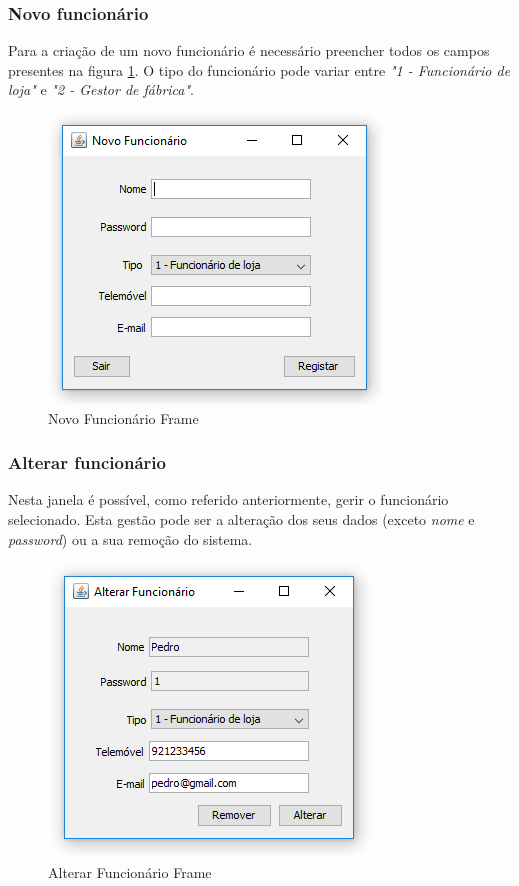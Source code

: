 \documentclass[11pt]{article} %
\begin{document}
\subsubsection{Novo funcionário}
\label{novofunc}

Para a criação de um novo funcionário é necessário preencher todos os campos presentes na figura \ref{novofuncframe}. O tipo do funcionário pode variar entre \textit{"1 - Funcionário de loja"} e \textit{"2 - Gestor de fábrica"}.

\begin{figure}[H]
	\centering
	\includegraphics[]{novofuncframe.png}
	\caption{Novo Funcionário Frame}
	\label{novofuncframe}
\end{figure}


\subsubsection{Alterar funcionário}
\label{alterafunc}

Nesta janela é possível, como referido anteriormente, gerir o funcionário selecionado. Esta gestão pode ser a alteração dos seus dados (exceto \textit{nome} e \textit{password}) ou a sua remoção do sistema.

\begin{figure}[H]
	\centering
	\includegraphics[]{alterarfuncframe.png}
	\caption{Alterar Funcionário Frame}
	\label{alterarfuncframe}
\end{figure}
\end{document}
